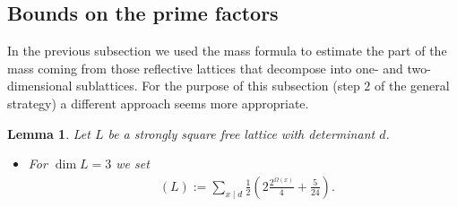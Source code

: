 \documentclass{amsart}
\newtheorem{lem}[thm]{Lemma}
\theoremstyle{definition}
\theoremstyle{remark}
\DeclareMathOperator{\Nref}{N_{ref}}
\begin{document}
\subsection{Bounds on the prime factors}
In the previous subsection we used the mass formula to estimate the part of the mass coming from those reflective lattices that decompose into one- and two-dimensional sublattices.
For the purpose of this subsection (step $2$ of the general strategy) a different approach seems more appropriate.
\begin{lem}
 Let $L$ be a strongly square free lattice with determinant $d$.
 \begin{itemize}

  \item[a)] For $\dim L = 3$ we set
    \begin{align*}
     \Nref(L):=\sum_{x \mid d} \frac{1}{2} \left( 2\frac{2^{\Omega(x)}}{4} + \frac{5}{24} \right).
    \end{align*}


\end{itemize}
\end{lem}
\end{document}
